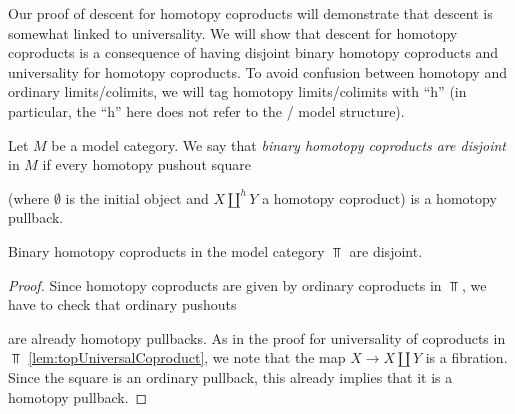 Our proof of descent for homotopy coproducts will demonstrate that descent is somewhat linked to universality.
We will show that descent for homotopy coproducts is a consequence of having disjoint binary homotopy coproducts and universality for homotopy coproducts.
To avoid confusion between homotopy and ordinary limits/colimits, we will tag homotopy limits/colimits with ``h'' (in particular, the ``h'' here does not refer to the \Strom/ model structure).
\begin{definition}
    Let $M$ be a model category.
    We say that \emph{binary homotopy coproducts are disjoint} in $M$ if every homotopy pushout square
    \begin{center}
    \end{center}
    (where $\emptyset$ is the initial object and $X\coprod\limits^h Y$ a homotopy coproduct) is a homotopy pullback.
\end{definition}
\begin{lemma}\label{lem:binCoprodDisjoint}
    Binary homotopy coproducts in the model category $\Top$ are disjoint.
    \begin{proof}
        Since homotopy coproducts are given by ordinary coproducts in $\Top$, we have to check that ordinary pushouts
        \begin{center}
        \end{center}
        are already homotopy pullbacks.
        As in the proof for universality of coproducts in $\Top$ \cref{lem:topUniversalCoproduct}, we note that the map $X\to X\coprod Y$ is a fibration.
        Since the square is an ordinary pullback, this already implies that it is a homotopy pullback.
    \end{proof}
\end{lemma}
